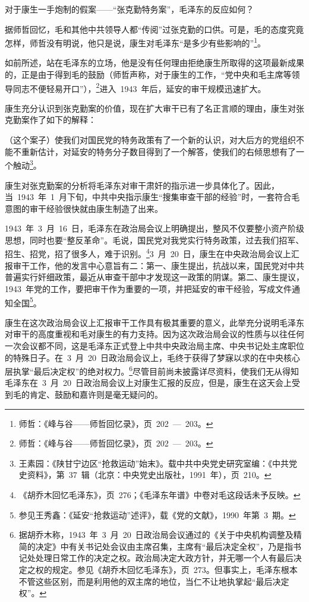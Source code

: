 对于康生一手炮制的假案——“张克勤特务案”，毛泽东的反应如何？

据师哲回忆，毛和其他中共领导人都“传阅”过张克勤的口供。可是，毛的态度究竟怎样，师哲没有明说，他只是说，康生对毛泽东“是多少有些影响的”\footnote{师哲：《峰与谷——师哲回忆录》，页~202~—~203。}。

如前所述，站在毛泽东的立场，他是没有任何理由拒绝康生所取得的这项最新成果的，正是由于得到毛的鼓励（师哲声称，对于康生的工作，“党中央和毛主席等领导同志不便轻易开口”），\footnote{师哲：《峰与谷——师哲回忆录》，页~202~—~203。}进入~1943~年后，延安的审干规模迅速扩大。

康生充分认识到张克勤案的价值，现在扩大审干已有了名正言顺的理由，康生对张克勤案作了如下的解释：

\begin{quoting}
（这个案子）使我们对国民党的特务政策有了一个新的认识，对大后方的党组织不能不重新估计，对延安的特务分子数目得到了一个解答，使我们的右倾思想有了一个触动\footnote{王素园：《陕甘宁边区“抢救运动”始末》。载中共中央党史研究室编：《中共党史资料》，第~37~辑（北京：中央党史出版社，1991~年），页~210。}。
\end{quoting}

康生对张克勤案的分析将毛泽东对审干肃奸的指示进一步具体化了。因此，当~1943~年~1~月下旬，中共中央指示康生“搜集审查干部的经验”时，一套符合毛意图的审干经验很快就由康生制造了出来。

1943~年~3~月~16~日，毛泽东在政治局会议上明确提出，整风不仅要整小资产阶级思想，同时也要“整反革命”。毛说，国民党对我党实行特务政策，过去我们招军、招生、招党，招了很多人，难于识别。\footnote{《胡乔木回忆毛泽东》，页~276；《毛泽东年谱》中卷对毛这段话未予反映。}3~月~20~日，康生在中央政治局会议上汇报审干工作，他的发言中心意旨有二：第一、康生提出，抗战以来，国民党对中共普遍实行奸细政策，最近从审查干部中才发现这一政策的阴谋。第二、康生提议，1943~年党的工作，要把审干作为重要的一项，并把延安的审干经验，写成文件通知全国\footnote{参见王秀鑫：《延安“抢救运动”述评》，载《党的文献》，1990~年第~3~期。}。

康生在这次政治局会议上汇报审干工作具有极其重要的意义，此举充分说明毛泽东对审干的高度重视和毛对康生的有力支持。因为这次政治局会议的性质与以往任何一次会议都不同，这是毛泽东正式登上中共中央政治局主席、中央书记处主席职位的特殊日子。在~3~月~20~日政治局会议上，毛终于获得了梦寐以求的在中央核心层执掌“最后决定权”的绝对权力。\footnote{据胡乔木称，1943~年~3~月~20~日政治局会议通过的《关于中央机构调整及精简的决定》中有关书记处会议由主席召集，主席有“最后决定全权”，乃是指书记处处理日常工作的决定之权。政治局决定大政方针，并无哪一个人有最后决定之权的规定。参见《胡乔木回忆毛泽东》，页~273。但事实上，毛泽东根本不管这些区别，而是利用他的双主席的地位，当仁不让地执掌起“最后决定权”。}尽管目前尚未披露详尽资料，使我们无从得知毛泽东在~3~月~20~日政治局会议上对康生汇报的反应，但是，康生在这天会上受到毛的肯定、鼓励和嘉许则是毫无疑问的。

